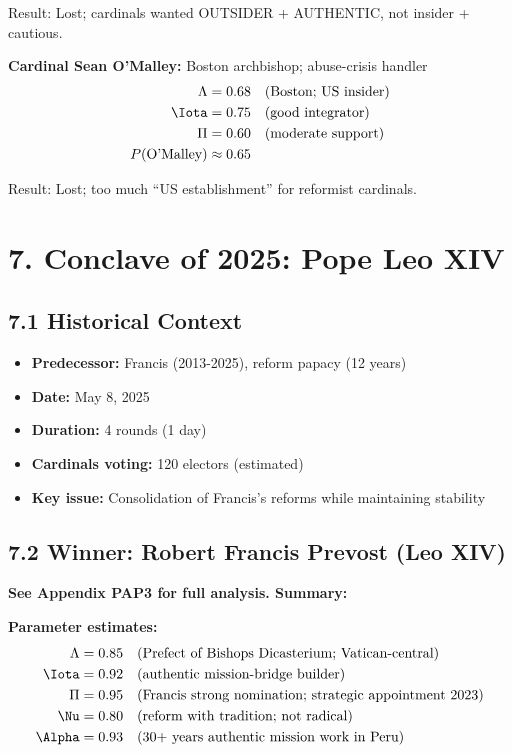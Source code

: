 Result: Lost; cardinals wanted OUTSIDER + AUTHENTIC, not insider + cautious.

\textbf{Cardinal Sean O'Malley:} Boston archbishop; abuse-crisis handler
\begin{align*}
\Lambda &= 0.68 \quad \text{(Boston; US insider)} \\
\Iota &= 0.75 \quad \text{(good integrator)} \\
\Pi &= 0.60 \quad \text{(moderate support)} \\
P(\text{O'Malley}) &\approx 0.65
\end{align*}

Result: Lost; too much ``US establishment'' for reformist cardinals.

\section{7. Conclave of 2025: Pope Leo XIV}

\subsection{7.1 Historical Context}

\begin{itemize}
\item \textbf{Predecessor:} Francis (2013-2025), reform papacy (12 years)
\item \textbf{Date:} May 8, 2025
\item \textbf{Duration:} 4 rounds (1 day)
\item \textbf{Cardinals voting:} 120 electors (estimated)
\item \textbf{Key issue:} Consolidation of Francis's reforms while maintaining stability
\end{itemize}

\subsection{7.2 Winner: Robert Francis Prevost (Leo XIV)}

\textbf{See Appendix PAP3 for full analysis. Summary:}

\textbf{Parameter estimates:}
\begin{align*}
\Lambda &= 0.85 \quad \text{(Prefect of Bishops Dicasterium; Vatican-central)} \\
\Iota &= 0.92 \quad \text{(authentic mission-bridge builder)} \\
\Pi &= 0.95 \quad \text{(Francis strong nomination; strategic appointment 2023)} \\
\Nu &= 0.80 \quad \text{(reform with tradition; not radical)} \\
\Alpha &= 0.93 \quad \text{(30+ years authentic mission work in Peru)}
\end{align*}

